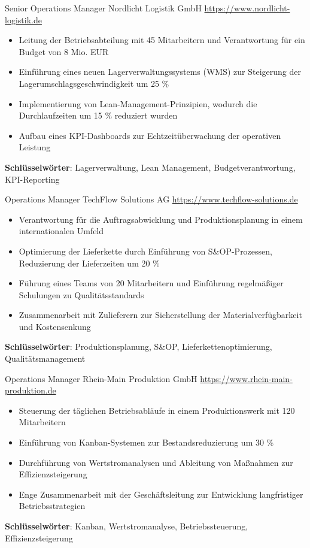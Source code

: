 \documentclass[a4paper, serif, 10pt]{moderncv}
\begin{document}
        {Senior Operations Manager}
        {Nordlicht Logistik GmbH}
        {\url{https://www.nordlicht-logistik.de}}
        {}
        {\begin{itemize}
\item Leitung der Betriebsabteilung mit 45 Mitarbeitern und Verantwortung für ein Budget von 8 Mio. EUR
\item Einführung eines neuen Lagerverwaltungssystems (WMS) zur Steigerung der Lagerumschlagsgeschwindigkeit um 25 \%
\item Implementierung von Lean-Management-Prinzipien, wodurch die Durchlaufzeiten um 15 \% reduziert wurden
\item Aufbau eines KPI-Dashboards zur Echtzeitüberwachung der operativen Leistung
\end{itemize}
\textbf{Schlüsselwörter}: Lagerverwaltung, Lean Management, Budgetverantwortung, KPI-Reporting}

        {Operations Manager}
        {TechFlow Solutions AG}
        {\url{https://www.techflow-solutions.de}}
        {}
        {\begin{itemize}
\item Verantwortung für die Auftragsabwicklung und Produktionsplanung in einem internationalen Umfeld
\item Optimierung der Lieferkette durch Einführung von S\&OP-Prozessen, Reduzierung der Lieferzeiten um 20 \%
\item Führung eines Teams von 20 Mitarbeitern und Einführung regelmäßiger Schulungen zu Qualitätsstandards
\item Zusammenarbeit mit Zulieferern zur Sicherstellung der Materialverfügbarkeit und Kostensenkung
\end{itemize}
\textbf{Schlüsselwörter}: Produktionsplanung, S\&OP, Lieferkettenoptimierung, Qualitätsmanagement}

        {Operations Manager}
        {Rhein-Main Produktion GmbH}
        {\url{https://www.rhein-main-produktion.de}}
        {}
        {\begin{itemize}
\item Steuerung der täglichen Betriebsabläufe in einem Produktionswerk mit 120 Mitarbeitern
\item Einführung von Kanban-Systemen zur Bestandsreduzierung um 30 \%
\item Durchführung von Wertstromanalysen und Ableitung von Maßnahmen zur Effizienzsteigerung
\item Enge Zusammenarbeit mit der Geschäftsleitung zur Entwicklung langfristiger Betriebsstrategien
\end{itemize}
\textbf{Schlüsselwörter}: Kanban, Wertstromanalyse, Betriebssteuerung, Effizienzsteigerung}
\end{document}
